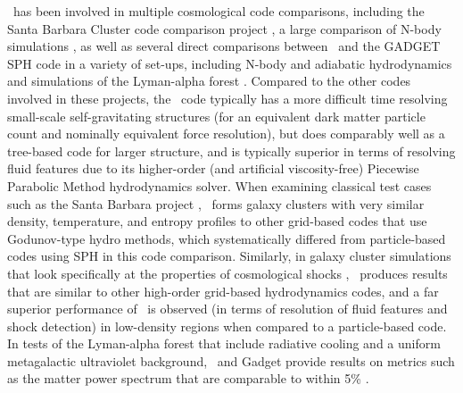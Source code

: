 \enzo\ has been involved in multiple cosmological code comparisons,
including the Santa Barbara Cluster code comparison project
\citep{SantaBarbara}, a large comparison of N-body simulations
\citep{2008CS&D....1a5003H}, as well as several direct comparisons
between \enzo\ and the GADGET SPH code in a variety of
set-ups, including N-body and adiabatic hydrodynamics
\citep{2005ApJS..160....1O,2005MNRAS.364..909V, 2011MNRAS.418..960V}
and simulations of the Lyman-alpha forest \citep{2007MNRAS.374..196R}.
Compared to the other codes involved in these projects, the \enzo\ code typically has a more difficult time resolving
small-scale self-gravitating structures (for an equivalent dark matter
particle count and nominally equivalent force resolution), but does
comparably well as a tree-based code for larger structure, and is
typically superior in terms of resolving fluid features due to its
higher-order (and artificial viscosity-free) Piecewise Parabolic
Method hydrodynamics solver.  When examining classical test cases such
as the Santa Barbara project \citep{SantaBarbara}, \enzo\ forms galaxy
clusters with very similar density, temperature, and entropy profiles
to other grid-based codes that use Godunov-type hydro methods, which
systematically differed from particle-based codes using SPH in this
code comparison.  Similarly, in galaxy cluster simulations that look
specifically at the properties of cosmological shocks
\citep[e.g.][]{2011MNRAS.418..960V}, \enzo\ produces results that are
similar to other high-order grid-based hydrodynamics codes, and a far
superior performance of \enzo\ is observed (in terms of resolution of
fluid features and shock detection) in low-density regions when
compared to a particle-based code.  In tests of the Lyman-alpha forest
that include radiative cooling and a uniform metagalactic ultraviolet
background, \enzo\ and Gadget provide results on metrics such as the
matter power spectrum that are comparable to within 5\%
\citep{2007MNRAS.374..196R}.

